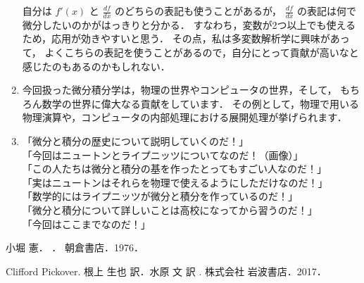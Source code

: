 \documentclass[11pt, a4paper]{jarticle}
\theoremstyle{definition}
\begin{document}
\begin{enumerate}
{				自分は $f'(x)$ と $\frac{df}{dx}$ のどちらの表記も使うことがあるが，
				$\frac{df}{dx}$ の表記は何で微分したいのかがはっきりと分かる．
				すなわち，変数が2つ以上でも使えるため，応用が効きやすいと思う．
				その点，私は多変数解析学に興味があって，
				よくこちらの表記を使うことがあるので，自分にとって貢献が高いなと感じたのもあるのかもしれない．
			}
			\item {
				今回扱った微分積分学は，物理の世界やコンピュータの世界，そして，
				もちろん数学の世界に偉大なる貢献をしています．
				その例として，物理で用いる物理演算や，コンピュータの内部処理における展開処理が挙げられます．
			}
			\item {
				「微分と積分の歴史について説明していくのだ！」\\
				「今回はニュートンとライプニッツについてなのだ！（画像）」\\
				「この人たちは微分と積分の基を作ったとってもすごい人なのだ！」\\
				「実はニュートンはそれらを物理で使えるようにしただけなのだ！」\\
				「数学的にはライプニッツが微分と積分を作っているのだ！」\\
				「微分と積分について詳しいことは高校になってから習うのだ！」\\
				「今回はここまでなのだ！」
			}
		\end{enumerate}
 	
 	\begin{thebibliography}{9}

		小堀 憲．
		．
		\newblock 朝倉書店．1976．
		
		Clifford Pickover. 根上 生也 訳．水原 文 訳
		.
		\newblock 株式会社 岩波書店．2017．
		
	\end{thebibliography}
	
\end{document}
